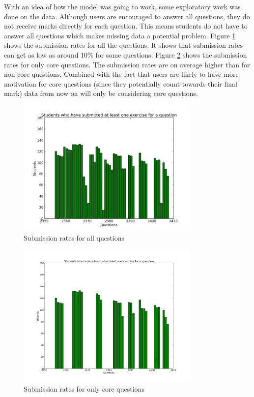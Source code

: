 With an idea of how the model was going to work, some exploratory work was done on the data. Although users are encouraged to answer all questions, they do not receive marks directly for each question. This means students do not have to answer all questions which makes missing data a potential problem. Figure \ref{fig:missing_data} shows the submission rates for all the questions. It shows that submission rates can get as low as around 10\% for some questions. Figure \ref{fig:missing_data_core} shows the submission rates for only core questions. The submission rates are on average higher than for non-core questions. Combined with the fact that users are likely to have more motivation for core questions (since they potentially count towards their final mark) data from now on will only be considering core questions.

\begin{figure}[h!] 
\centering
\includegraphics[width=0.8\textwidth]{images/missing_data.png}
\caption{Submission rates for all questions}
\label{fig:missing_data}
\end{figure}

\begin{figure}[h!]
\centering
\includegraphics[width=0.8\textwidth]{images/missing_data_core.png}
\caption{Submission rates for only core questions}
\label{fig:missing_data_core}
\end{figure}

